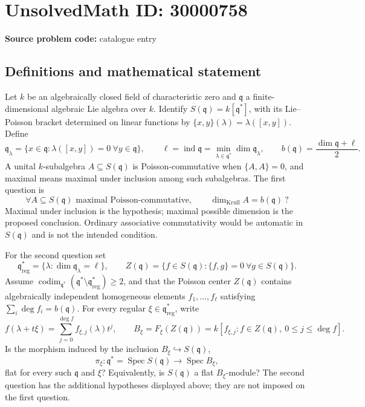 \documentclass[11pt]{article}
\begin{document}
\section*{UnsolvedMath ID: 30000758}
\textbf{Source problem code:} catalogue entry
\subsection{Definitions and mathematical statement}
Let \(k\) be an algebraically closed field of characteristic zero and \(\mathfrak q\) a finite-dimensional algebraic Lie algebra over \(k\). Identify \(S(\mathfrak q)=k[\mathfrak q^*]\), with its Lie--Poisson bracket determined on linear functions by \(\{x,y\}(\lambda)=\lambda([x,y])\). Define
\[
 \mathfrak q_\lambda=\{x\in\mathfrak q:\lambda([x,y])=0\ \forall y\in\mathfrak q\},\qquad
 \ell=\operatorname{ind}\mathfrak q=\min_{\lambda\in\mathfrak q^*}\dim\mathfrak q_\lambda,
 \qquad b(\mathfrak q)=\frac{\dim\mathfrak q+\ell}{2}.
\]
A unital \(k\)-subalgebra \(A\subseteq S(\mathfrak q)\) is Poisson-commutative when \(\{A,A\}=0\), and maximal means maximal under inclusion among such subalgebras. The first question is
\[
 \forall A\subseteq S(\mathfrak q)\text{ maximal Poisson-commutative},\qquad
 \dim_{\mathrm{Krull}}A=b(\mathfrak q)\ ?
\]
Maximal under inclusion is the hypothesis; maximal possible dimension is the proposed conclusion. Ordinary associative commutativity would be automatic in \(S(\mathfrak q)\) and is not the intended condition.

For the second question set
\[
 \mathfrak q^*_{\mathrm{reg}}=\{\lambda:\dim\mathfrak q_\lambda=\ell\},\qquad
 Z(\mathfrak q)=\{f\in S(\mathfrak q):\{f,g\}=0\ \forall g\in S(\mathfrak q)\}.
\]
Assume \(\operatorname{codim}_{\mathfrak q^*}(\mathfrak q^*\setminus\mathfrak q^*_{\mathrm{reg}})\geq2\), and that the Poisson center \(Z(\mathfrak q)\) contains algebraically independent homogeneous elements \(f_1,\ldots,f_\ell\) satisfying \(\sum_i\deg f_i=b(\mathfrak q)\). For every regular \(\xi\in\mathfrak q^*_{\mathrm{reg}}\), write
\[
 f(\lambda+t\xi)=\sum_{j=0}^{\deg f}f_{\xi,j}(\lambda)t^j,
 \qquad
 B_\xi=F_\xi(Z(\mathfrak q))
   =k[f_{\xi,j}:f\in Z(\mathfrak q),\ 0\leq j\leq\deg f].
\]
Is the morphism induced by the inclusion \(B_\xi\hookrightarrow S(\mathfrak q)\),
\[
 \pi_\xi:\mathfrak q^*=\operatorname{Spec}S(\mathfrak q)
       \longrightarrow\operatorname{Spec}B_\xi,
\]
flat for every such \(\mathfrak q\) and \(\xi\)? Equivalently, is \(S(\mathfrak q)\) a flat \(B_\xi\)-module? The second question has the additional hypotheses displayed above; they are not imposed on the first question.
\end{document}
